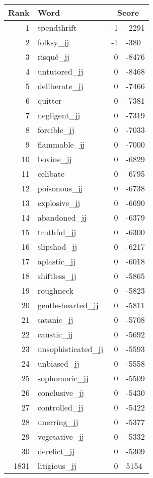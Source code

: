 \begin{longtable}[!htbp]{| rlr@{.}l |}
    \hline
    \textbf{Rank} & \textbf{Word} & \multicolumn{2}{c|}{\textbf{Score}} \\
    \hline
    \endhead
    1 & spendthrift & -1 & -2291 \\
    2 & folksy\_jj & -1 & -380 \\
    3 & risqué\_jj & 0 & -8476 \\
    4 & untutored\_jj & 0 & -8468 \\
    5 & deliberate\_jj & 0 & -7466 \\
    6 & quitter & 0 & -7381 \\
    7 & negligent\_jj & 0 & -7319 \\
    8 & forcible\_jj & 0 & -7033 \\
    9 & flammable\_jj & 0 & -7000 \\
    10 & bovine\_jj & 0 & -6829 \\
    11 & celibate & 0 & -6795 \\
    12 & poisonous\_jj & 0 & -6738 \\
    13 & explosive\_jj & 0 & -6690 \\
    14 & abandoned\_jj & 0 & -6379 \\
    15 & truthful\_jj & 0 & -6300 \\
    16 & slipshod\_jj & 0 & -6217 \\
    17 & aplastic\_jj & 0 & -6018 \\
    18 & shiftless\_jj & 0 & -5865 \\
    19 & roughneck & 0 & -5823 \\
    20 & gentle-hearted\_jj & 0 & -5811 \\
    21 & satanic\_jj & 0 & -5708 \\
    22 & caustic\_jj & 0 & -5692 \\
    23 & unsophisticated\_jj & 0 & -5593 \\
    24 & unbiased\_jj & 0 & -5558 \\
    25 & sophomoric\_jj & 0 & -5509 \\
    26 & conclusive\_jj & 0 & -5430 \\
    27 & controlled\_jj & 0 & -5422 \\
    28 & unerring\_jj & 0 & -5377 \\
    29 & vegetative\_jj & 0 & -5332 \\
    30 & derelict\_jj & 0 & -5309 \\
    1831 & litigious\_jj & 0 & 5154 \\

\end{longtable}
